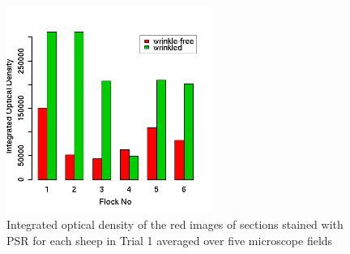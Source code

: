 %

\begin{figure}[!h]
  \centering
  \captionsetup{width=0.6\textwidth}
  \includegraphics[width=0.6\textwidth]{newfig6.png}
  \caption{Integrated optical density of the red images of sections stained with PSR for each sheep in Trial 1 averaged over five microscope fields}
  \label{fig:redpixt1}
\end{figure}

%

